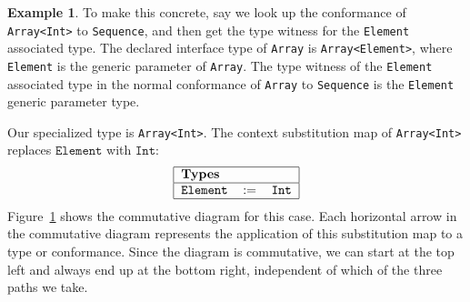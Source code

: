 \documentclass[a4paper,headsepline,bibliography=totoc,toc=flat,fleqn,twoside=semi]{scrbook}
\theoremstyle{definition}
\theoremstyle{definition}
\newtheorem{example}{Example}[chapter]
\theoremstyle{definition}
\newcommand{\ttbox}[1]{\boxed{\mbox{\vphantom{pI\texttt{pI}}\texttt{#1}}}}
\newcommand{\SubMap}[1]{\begin{tabular}{|lll|}
\hline
\multicolumn{3}{|l|}{\textbf{Types}}\\
\hline
#1\\
\hline
\end{tabular}}
\newcommand{\SubType}[2]{\texttt{#1}&$:=$&\texttt{#2}}
\begin{document}
\begin{example}
To make this concrete, say we look up the conformance of \texttt{Array<Int>} to \texttt{Sequence}, and then get the type witness for the \texttt{Element} associated type. The declared interface type of \texttt{Array} is \texttt{Array<Element>}, where \texttt{Element} is the generic parameter of \texttt{Array}. The type witness of the \texttt{Element} associated type in the normal conformance of \texttt{Array} to \texttt{Sequence} is the \texttt{Element} generic parameter type.

Our specialized type is \texttt{Array<Int>}. The context substitution map of \texttt{Array<Int>} replaces $\texttt{Element}$ with $\texttt{Int}$:
\[\SubMap{\SubType{Element}{Int}}\]
Figure~\ref{type witness diagram example} shows the commutative diagram for this case. Each horizontal arrow in the commutative diagram represents the application of this substitution map to a type or conformance. Since the diagram is commutative, we can start at the top left and always end up at the bottom right, independent of which of the three paths we take.
\begin{figure}\label{type witness diagram example}
\begin{center}
\end{center}
\end{figure}
\end{example}
\end{document}
